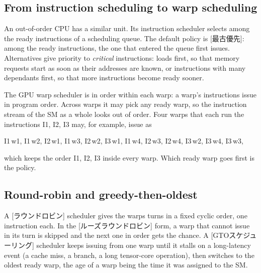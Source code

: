 \documentclass[../main.tex]{subfiles}
\begin{document}
%
\subsection{From instruction scheduling to warp scheduling}

An out-of-order CPU has a similar unit.  Its instruction scheduler
selects among the ready instructions of a scheduling queue.  The
default policy is [最古優先]: among the ready
instructions, the one that entered the queue first issues.
Alternatives give priority to \emph{critical} instructions: loads
first, so that memory requests start as soon as their addresses are
known, or instructions with many dependants first, so that more
instructions become ready sooner.

The GPU warp scheduler is in order within each warp: a warp's
instructions issue in program order.  Across warps it may pick any
ready warp, so the instruction stream of the SM as a whole looks out of
order.  Four warps that each run the instructions I1, I2, I3 may, for
example, issue as
\begin{center}
  \small
  I1\,w1, I1\,w2, I2\,w1, I1\,w3, I2\,w2, I3\,w1, I1\,w4, I2\,w3,
  I2\,w4, I3\,w2, I3\,w4, I3\,w3,
\end{center}
which keeps the order I1, I2, I3 inside every warp.  Which ready warp goes first is the
policy.

\subsection{Round-robin and greedy-then-oldest}

\begin{definition}
  \label{def:l07-rr-gto}
  A [ラウンドロビン] scheduler gives the warps
  turns in a fixed cyclic order, one instruction each.  In the
  [ルーズラウンドロビン] form, a warp
  that cannot issue in its turn is skipped and the next one in order
  gets the chance.  A
  [GTOスケジューリング] scheduler keeps
  issuing from one warp until it stalls on a long-latency event (a
  cache miss, a branch, a long tensor-core operation), then switches to
  the oldest ready warp, the age of a warp being the time it was
  assigned to the SM.
\end{definition}
\end{document}
